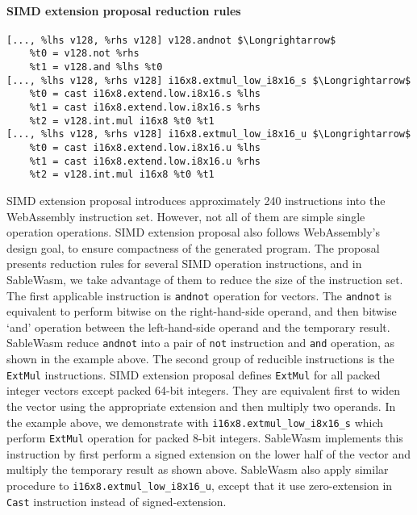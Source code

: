 \paragraph{SIMD extension proposal reduction rules} \quad
\begin{lstlisting}[basicstyle=\linespread{1}\small\ttfamily, language=SableWasmMIR, mathescape=true]
[..., %lhs v128, %rhs v128] v128.andnot $\Longrightarrow$
    %t0 = v128.not %rhs 
    %t1 = v128.and %lhs %t0
[..., %lhs v128, %rhs v128] i16x8.extmul_low_i8x16_s $\Longrightarrow$
    %t0 = cast i16x8.extend.low.i8x16.s %lhs
    %t1 = cast i16x8.extend.low.i8x16.s %rhs
    %t2 = v128.int.mul i16x8 %t0 %t1
[..., %lhs v128, %rhs v128] i16x8.extmul_low_i8x16_u $\Longrightarrow$
    %t0 = cast i16x8.extend.low.i8x16.u %lhs
    %t1 = cast i16x8.extend.low.i8x16.u %rhs
    %t2 = v128.int.mul i16x8 %t0 %t1
\end{lstlisting}
SIMD extension proposal introduces approximately 240 instructions into the WebAssembly instruction set. However, not all of them are simple single operation operations. SIMD extension proposal also follows WebAssembly's design goal, to ensure compactness of the generated program. The proposal presents reduction rules for several SIMD operation instructions, and in SableWasm, we take advantage of them to reduce the size of the instruction set. The first applicable instruction is \texttt{andnot} operation for vectors. The \texttt{andnot} is equivalent to perform bitwise on the right-hand-side operand, and then bitwise `and' operation between the left-hand-side operand and the temporary result. SableWasm reduce \texttt{andnot} into a pair of \texttt{not} instruction and \texttt{and} operation, as shown in the example above. The second group of reducible instructions is the \texttt{ExtMul} instructions. SIMD extension proposal defines \texttt{ExtMul} for all packed integer vectors except packed 64-bit integers. They are equivalent first to widen the vector using the appropriate extension and then multiply two operands. In the example above, we demonstrate with \texttt{i16x8.extmul\_low\_i8x16\_s} which perform \texttt{ExtMul} operation for packed 8-bit integers. SableWasm implements this instruction by first perform a signed extension on the lower half of the vector and multiply the temporary result as shown above. SableWasm also apply similar procedure to \texttt{i16x8.extmul\_low\_i8x16\_u}, except that it use zero-extension in \texttt{Cast} instruction instead of signed-extension.

